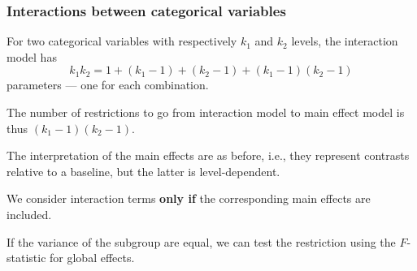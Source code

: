 \documentclass{beamer}
\begin{document}
 
\begin{frame}
\frametitle{Interactions between categorical variables}
\bi
\item For two categorical variables with respectively $k_1$ and $k_2$ levels, the interaction model has \[k_1k_2 = 1+ (k_1-1) + (k_2-1) + (k_1-1)(k_2-1)\] parameters --- one for each combination.
\item The number of restrictions to go from interaction model to main effect model is thus $(k_1-1)(k_2-1)$.
\item The interpretation of the main effects are as before, i.e., they represent contrasts relative to a baseline, but the latter is level-dependent.
\item We consider interaction terms \textbf{only if} the corresponding main effects are included.
\item If the variance of the subgroup are equal, we can test the restriction using the $F$-statistic for global effects.
\ei
\end{frame}
\end{document}
